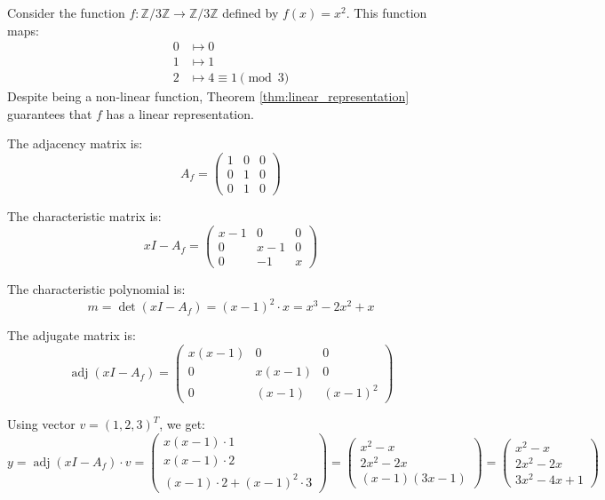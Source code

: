 \begin{example}
\label{ex:quadratic_Z3}
Consider the function $f: \mathbb{Z}/3\mathbb{Z} \to \mathbb{Z}/3\mathbb{Z}$ defined by $f(x) = x^2$.
This function maps:
\begin{align*}
0 &\mapsto 0 \\
1 &\mapsto 1 \\
2 &\mapsto 4 \equiv 1 \pmod{3}
\end{align*}
Despite being a non-linear function, Theorem \ref{thm:linear_representation} guarantees that $f$ has a linear representation.

The adjacency matrix is:
$$A_f = \begin{pmatrix}
1 & 0 & 0 \\
0 & 1 & 0 \\
0 & 1 & 0
\end{pmatrix}$$

The characteristic matrix is:
$$x I - A_f = \begin{pmatrix}
x-1 & 0 & 0 \\
0 & x-1 & 0 \\
0 & -1 & x
\end{pmatrix}$$

The characteristic polynomial is:
$$m = \det(x I - A_f) = (x-1)^2 \cdot x = x^3 - 2x^2 + x$$

The adjugate matrix is:
$$\operatorname{adj}(x I - A_f) = \begin{pmatrix}
x(x-1) & 0 & 0 \\
0 & x(x-1) & 0 \\
0 & (x-1) & (x-1)^2
\end{pmatrix}$$

Using vector $v = (1, 2, 3)^T$, we get:
$$y = \operatorname{adj}(x I - A_f) \cdot v = \begin{pmatrix}
x(x-1) \cdot 1 \\
x(x-1) \cdot 2 \\
(x-1) \cdot 2 + (x-1)^2 \cdot 3
\end{pmatrix} = \begin{pmatrix}
x^2 - x \\
2x^2 - 2x \\
(x-1)(3x-1)
\end{pmatrix} = \begin{pmatrix}
x^2 - x \\
2x^2 - 2x \\
3x^2 - 4x + 1
\end{pmatrix}$$


\end{example}
